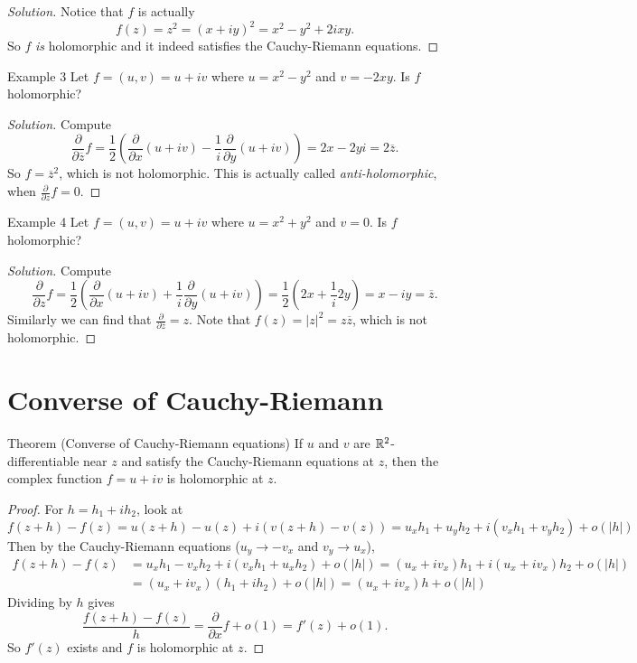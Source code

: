 \begin{proof}[Solution]
  Notice that $f$ is actually
  \[f(z) = z^2 = (x + iy)^2 = x^2 - y^2 + 2ixy.\]
  So $f$ \textit{is} holomorphic and it indeed satisfies
  the Cauchy-Riemann equations.
\end{proof}

\begin{examp}{Example 3}
  Let $f = (u, v) = u + iv$ where $u = x^2 - y^2$ and
  $v = -2xy$. Is $f$ holomorphic?
\end{examp}

\begin{proof}[Solution]
  Compute
  \[
    \frac{\partial}{\partial \overline{z}} f
    = \frac{1}{2}\left(\frac{\partial}{\partial x} (u + iv) - \frac{1}{i} \frac{\partial}{\partial y} (u + iv)\right)
    = 2x - 2yi = 2\overline{z}
  .\]
  So $f = {\overline{z}}^2$, which is not
  holomorphic. This is actually called
  \textit{anti-holomorphic}, when
  $\frac{\partial}{\partial z} f = 0$.
\end{proof}

\begin{examp}{Example 4}
  Let $f = (u, v) = u + iv$ where $u = x^2 + y^2$ and
  $v = 0$. Is $f$ holomorphic?
\end{examp}

\begin{proof}[Solution]
  Compute
  \[
  \frac{\partial}{\partial z} f =
  \frac{1}{2}\left(\frac{\partial}{\partial x}(u + iv) + \frac{1}{i} \frac{\partial}{\partial y} (u + iv)\right)
  = \frac{1}{2}\left(2x + \frac{1}{i} 2y\right)
  = x - iy = \overline{z}
  .\]
  Similarly we can find that
  $\frac{\partial}{\partial \overline{z}} = z$.
  Note that $f(z) = |z|^2 = z \overline{z}$, which
  is not holomorphic.
\end{proof}

\section{Converse of Cauchy-Riemann}
\begin{thm}{Theorem (Converse of Cauchy-Riemann equations)}
  If $u$ and $v$ are $\mathbb{R}^2$-differentiable near $z$ and
  satisfy the Cauchy-Riemann equations at $z$,
  then the complex function $f = u + iv$ is holomorphic
  at $z$.
\end{thm}

\begin{proof}
  For $h = h_1 + ih_2$, look at
  \[
    f(z + h) - f(z) = u(z + h) - u(z)
    + i(v(z + h) - v(z))
    = u_x h_1 + u_y h_2 + i(v_x h_1 + v_y h_2)
    + o(|h|)
  \]
  Then by the Cauchy-Riemann equations
  ($u_y \to -v_x$ and $v_y \to u_x$),
  \begin{align*}
    f(z + h) - f(z)
    &= u_x h_1 - v_x h_2 + i(v_x h_1 + u_x h_2) + o(|h|)
    = (u_x + iv_x) h_1 + i(u_x + iv_x) h_2 + o(|h|) \\
    &= (u_x + iv_x) (h_1 + ih_2) + o(|h|)
    = (u_x + iv_x) h + o(|h|)
  \end{align*}
  Dividing by $h$ gives
  \[
    \frac{f(z + h) - f(z)}{h} =
    \frac{\partial}{\partial x} f + o(1)
    = f'(z) + o(1)
  .\]
  So $f'(z)$ exists and $f$ is holomorphic at $z$.
\end{proof}

